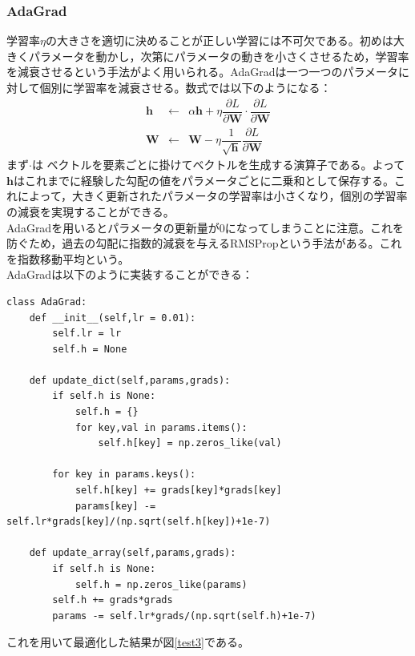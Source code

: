 \documentclass{jarticle}
\begin{document}
\subsubsection{AdaGrad}
学習率$\eta$の大きさを適切に決めることが正しい学習には不可欠である。初めは大きくパラメータを動かし，次第にパラメータの動きを小さくさせるため，学習率を減衰させるという手法がよく用いられる。AdaGradは一つ一つのパラメータに対して個別に学習率を減衰させる。数式では以下のようになる：
\begin{eqnarray*}
\bm{h} &\leftarrow& \alpha \bm{h} + \eta \dfrac{\partial L}{\partial \bm{W}} \cdot \dfrac{\partial L}{\partial \bm{W}}\\
\bm{W} &\leftarrow& \bm{W}-\eta \dfrac{1}{\sqrt{\bm{h}}} \dfrac{\partial L}{\partial \bm{W}}
\end{eqnarray*}
まず$\cdot$は%
ベクトルを要素ごとに掛けてベクトルを生成する演算子である。よって$\bm{h}$はこれまでに経験した勾配の値をパラメータごとに二乗和として保存する。これによって，大きく更新されたパラメータの学習率は小さくなり，個別の学習率の減衰を実現することができる。\\
AdaGradを用いるとパラメータの更新量が$0$になってしまうことに注意。これを防ぐため，過去の勾配に指数的減衰を与えるRMSPropという手法がある。これを指数移動平均という。\\
AdaGradは以下のように実装することができる：
\begin{lstlisting}
class AdaGrad:
	def __init__(self,lr = 0.01):
		self.lr = lr
		self.h = None
		
	def update_dict(self,params,grads):
		if self.h is None:
			self.h = {}
			for key,val in params.items():
				self.h[key] = np.zeros_like(val)
				
		for key in params.keys():
			self.h[key] += grads[key]*grads[key]
			params[key] -= self.lr*grads[key]/(np.sqrt(self.h[key])+1e-7)
	
	def update_array(self,params,grads):
		if self.h is None:
			self.h = np.zeros_like(params)
		self.h += grads*grads
		params -= self.lr*grads/(np.sqrt(self.h)+1e-7)

\end{lstlisting}
これを用いて最適化した結果が図\ref{test3}である。
\end{document}

